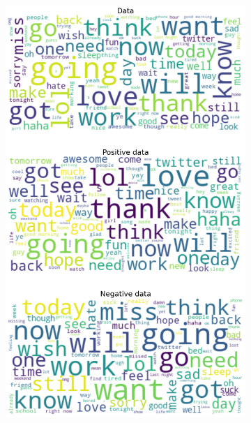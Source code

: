 \documentclass{article}
\begin{document}
\begin{itemize}
\begin{figure}[H]
\begin{subfigure}[b]{0.24\textwidth}
\includegraphics[width=\textwidth]{chapter-06/section-01-01/09/visualization/2/wordcloud.png}
\end{subfigure}
\begin{subfigure}[b]{0.24\textwidth}
\centering

\end{subfigure}
\end{figure}
\end{itemize}
\end{document}
